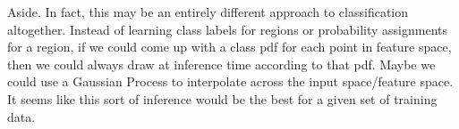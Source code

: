 \documentclass{article}
\begin{document}
Aside.  In fact, this may be an entirely different approach to classification altogether.  Instead of learning class labels for regions or probability assignments for a region, if we could come up with a class pdf for each point in feature space, then we could always draw at inference time according to that pdf.  Maybe we could use a Gaussian Process to interpolate across the input space/feature space.  It seems like this sort of inference would be the best for a given set of training data.



\end{document}
